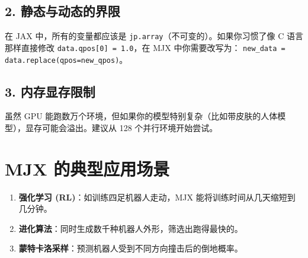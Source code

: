 \documentclass[11pt,a4paper]{book}
\begin{document}
\subsection{2. 静态与动态的界限}
在 JAX 中，所有的变量都应该是 \texttt{jp.array}（不可变的）。如果你习惯了像 C 语言那样直接修改 \texttt{data.qpos[0] = 1.0}，在 MJX 中你需要改写为：
\texttt{new\_data = data.replace(qpos=new\_qpos)}。

\subsection{3. 内存显存限制}
虽然 GPU 能跑数万个环境，但如果你的模型特别复杂（比如带皮肤的人体模型），显存可能会溢出。建议从 128 个并行环境开始尝试。

\section{MJX 的典型应用场景}
\begin{enumerate}
    \item \textbf{强化学习 (RL)}：如训练四足机器人走动，MJX 能将训练时间从几天缩短到几分钟。
    \item \textbf{进化算法}：同时生成数千种机器人外形，筛选出跑得最快的。
    \item \textbf{蒙特卡洛采样}：预测机器人受到不同方向撞击后的倒地概率。
\end{enumerate}




\backmatter
\end{document}
